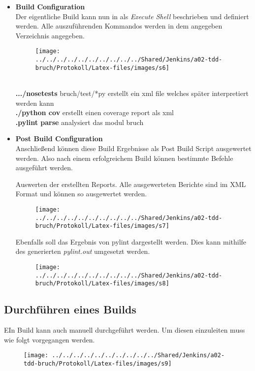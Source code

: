 \begin{itemize}
	\item \textbf{Build Configuration}\\
	Der eigentliche Build kann nun in als \textit{Execute Shell} beschrieben und definiert werden. Alle auszuführenden Kommandos werden in dem angegeben Verzeichnis angegeben.
	\begin{figure}[!h]
		\centering
		\texttt{[image: ../../../../../../../../../../Shared/Jenkins/a02-tdd-bruch/Protokoll/Latex-files/images/s6]}
		\label{fig:s6}
	\end{figure}\\
	\textbf{.../nosetests} \hspace{0.7cm} bruch/test/*py erstellt ein xml file welches später interpretiert werden kann\\
	\textbf{./python cov} \hspace{0.5cm} erstellt einen coverage report als xml\\
	\textbf{.pylint parse} \hspace{0.5cm} analysiert das modul bruch\\
	
	\clearpage
	
	\item \textbf{Post Build Configuration}\\
	Anschließend können diese Build Ergebnisse als Post Build Script ausgewertet werden. Also nach einem erfolgreichem Build können bestimmte Befehle ausgeführt werden.
	
	Auswerten der erstellten Reports. Alle ausgewerteten Berichte sind im XML Format und können so ausgewertet werden.
	\begin{figure}[!h]
		\centering
		\texttt{[image: ../../../../../../../../../../Shared/Jenkins/a02-tdd-bruch/Protokoll/Latex-files/images/s7]}
		\label{fig:s7}
	\end{figure}
	Ebenfalls soll das Ergebnis von pylint dargestellt werden. Dies kann mithilfe des generierten \textit{pylint.out} umgesetzt werden.
	\begin{figure}[!h]
		\centering
		\texttt{[image: ../../../../../../../../../../Shared/Jenkins/a02-tdd-bruch/Protokoll/Latex-files/images/s8]}
		\label{fig:s8}
	\end{figure}
\end{itemize}

\clearpage
\subsection{Durchführen eines Builds}
EIn Build kann auch manuell durchgeführt werden. Um diesen einzuleiten muss wie folgt vorgegangen werden.
\begin{figure}[!h]
	\centering
	\texttt{[image: ../../../../../../../../../../Shared/Jenkins/a02-tdd-bruch/Protokoll/Latex-files/images/s9]}
	\label{fig:s9}
\end{figure}
\clearpage
